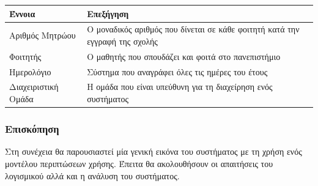 \documentclass[
]{article}
\begin{document}
\begin{longtable}[]{@{}ll@{}}
\toprule
\begin{minipage}[b]{0.37\columnwidth}\raggedright
Έννοια\strut
\end{minipage} & \begin{minipage}[b]{0.57\columnwidth}\raggedright
Επεξήγηση\strut
\end{minipage}\tabularnewline
\midrule
\endhead
\begin{minipage}[t]{0.37\columnwidth}\raggedright
Αριθμός Μητρώου\strut
\end{minipage} & \begin{minipage}[t]{0.57\columnwidth}\raggedright
Ο μοναδικός αριθμός που δίνεται σε κάθε φοιτητή κατά την εγγραφή της
σχολής\strut
\end{minipage}\tabularnewline
\begin{minipage}[t]{0.37\columnwidth}\raggedright
Φοιτητής\strut
\end{minipage} & \begin{minipage}[t]{0.57\columnwidth}\raggedright
Ο μαθητής που σπουδάζει και φοιτά στο πανεπιστήμιο\strut
\end{minipage}\tabularnewline
\begin{minipage}[t]{0.37\columnwidth}\raggedright
Ημερολόγιο\strut
\end{minipage} & \begin{minipage}[t]{0.57\columnwidth}\raggedright
Σύστημα που αναγράφει όλες τις ημέρες του έτους\strut
\end{minipage}\tabularnewline
\begin{minipage}[t]{0.37\columnwidth}\raggedright
Διαχειριστική Ομάδα\strut
\end{minipage} & \begin{minipage}[t]{0.57\columnwidth}\raggedright
Η ομάδα που είναι υπεύθυνη για τη διαχείρηση ενός συστήματος\strut
\end{minipage}\tabularnewline
\bottomrule
\end{longtable}

\hypertarget{ux3b5ux3c0ux3b9ux3c3ux3baux3ccux3c0ux3b7ux3c3ux3b7}{%
\subsubsection{Επισκόπηση}\label{ux3b5ux3c0ux3b9ux3c3ux3baux3ccux3c0ux3b7ux3c3ux3b7}}

Στη συνέχεια θα παρουσιαστεί μία γενική εικόνα του συστήματος με τη
χρήση ενός μοντέλου περιπτώσεων χρήσης. Έπειτα θα ακολουθήσουν οι
απαιτήσεις του λογισμικού αλλά και η ανάλυση του συστήματος.
\end{document}

